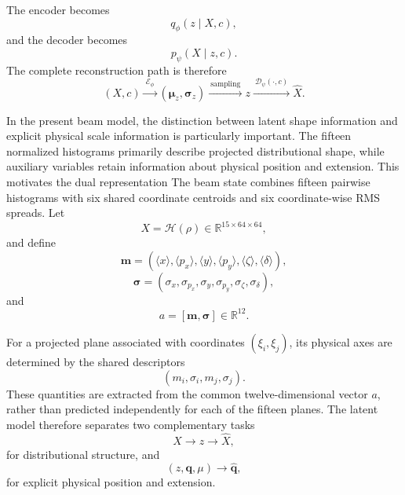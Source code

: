 The encoder becomes
\begin{equation}
    q_{\phi}(z\mid X,c),
\end{equation}
and the decoder becomes
\begin{equation}
    p_{\psi}(X\mid z,c).
\end{equation}
The complete reconstruction path is therefore
\begin{equation}
    (X,c)
    \xrightarrow{\ \mathcal{E}_{\phi}\ }
    (\bm{\mu}_z,\bm{\sigma}_z)
    \xrightarrow{\ \text{sampling}\ }
    z
    \xrightarrow{\ \mathcal{D}_{\psi}(\cdot,c)\ }
    \widehat{X}.
    \label{eq:cvae_basic_pipeline}
\end{equation}

In the present beam model, the distinction between latent shape information and explicit physical scale information is particularly important. The fifteen normalized histograms primarily describe projected distributional shape, while auxiliary variables retain information about physical position and extension. This motivates the dual representation
The beam state combines fifteen pairwise histograms with six shared coordinate centroids and six coordinate-wise RMS spreads. Let
\begin{equation}
    X=\mathcal{H}(\rho)
    \in\mathbb{R}^{15\times64\times64},
\end{equation}
and define
\begin{equation}
    \bm m
    =
    \left(
        \langle x\rangle,
        \langle p_x\rangle,
        \langle y\rangle,
        \langle p_y\rangle,
        \langle\zeta\rangle,
        \langle\delta\rangle
    \right),
\end{equation}
\begin{equation}
    \bm\sigma
    =
    \left(
        \sigma_x,
        \sigma_{p_x},
        \sigma_y,
        \sigma_{p_y},
        \sigma_{\zeta},
        \sigma_{\delta}
    \right),
\end{equation}
and
\begin{equation}
    a=[\bm m,\bm\sigma]\in\mathbb{R}^{12}.
    \label{eq:physical_statistics_vector}
\end{equation}

For a projected plane associated with coordinates \((\xi_i,\xi_j)\), its physical axes are determined by the shared descriptors
\begin{equation}
    (m_i,\sigma_i,m_j,\sigma_j).
\end{equation}
These quantities are extracted from the common twelve-dimensional vector \(a\), rather than predicted independently for each of the fifteen planes. The latent model therefore separates two complementary tasks
\begin{equation}
    X
    \longrightarrow
    z
    \longrightarrow
    \widehat{X},
\end{equation}
for distributional structure, and
\begin{equation}
    (z,\bm q,\mu)
    \longrightarrow
    \widehat{\bm q},
\end{equation}
for explicit physical position and extension.

